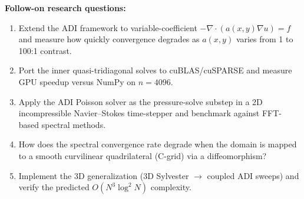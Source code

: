 \noindent\textbf{Follow-on research questions:}
\begin{enumerate}[leftmargin=1.6em,itemsep=0.2em,topsep=0.2em,label=Q\arabic*.]
\item Extend the ADI framework to variable-coefficient $-\nabla\cdot(a(x,y)\nabla u) = f$ and measure how quickly convergence degrades as $a(x,y)$ varies from 1 to 100:1 contrast.
\item Port the inner quasi-tridiagonal solves to cuBLAS/cuSPARSE and measure GPU speedup versus NumPy on $n=4096$.
\item Apply the ADI Poisson solver as the pressure-solve substep in a 2D incompressible Navier--Stokes time-stepper and benchmark against FFT-based spectral methods.
\item How does the spectral convergence rate degrade when the domain is mapped to a smooth curvilinear quadrilateral (C-grid) via a diffeomorphism?
\item Implement the 3D generalization (3D Sylvester $\rightarrow$ coupled ADI sweeps) and verify the predicted $O(N^3\log^2 N)$ complexity.
\end{enumerate}

